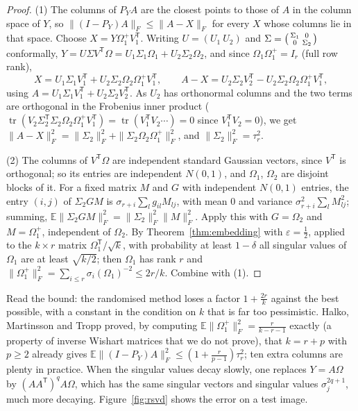 \begin{proof}
(1) The columns of $P_YA$ are the closest points to those of $A$ in the column space of $Y$, so $\|(I-P_Y)A\|_F\le\|A-X\|_F$ for every $X$ whose columns lie in that space. Choose
$X=Y\Omega_1^+V_1^{\mathsf T}$. Writing $U=(U_1\ U_2)$ and $\Sigma=\begin{psmallmatrix}\Sigma_1&0\\0&\Sigma_2\end{psmallmatrix}$ conformally,
$Y=U\Sigma V^{\mathsf T}\Omega=U_1\Sigma_1\Omega_1+U_2\Sigma_2\Omega_2$, and since $\Omega_1\Omega_1^+=I_r$ (full row rank),
\[
X=U_1\Sigma_1V_1^{\mathsf T}+U_2\Sigma_2\Omega_2\Omega_1^+V_1^{\mathsf T},\qquad A-X=U_2\Sigma_2V_2^{\mathsf T}-U_2\Sigma_2\Omega_2\Omega_1^+V_1^{\mathsf T},
\]
using $A=U_1\Sigma_1V_1^{\mathsf T}+U_2\Sigma_2V_2^{\mathsf T}$. As $U_2$ has orthonormal columns and the two terms are orthogonal in the Frobenius inner product
($\operatorname{tr}(V_2\Sigma_2^{\mathsf T}\Sigma_2\Omega_2\Omega_1^+V_1^{\mathsf T})=\operatorname{tr}(V_1^{\mathsf T}V_2\cdots)=0$ since $V_1^{\mathsf T}V_2=0$), we get
$\|A-X\|_F^2=\|\Sigma_2\|_F^2+\|\Sigma_2\Omega_2\Omega_1^+\|_F^2$, and $\|\Sigma_2\|_F^2=\tau_r^2$.

(2) The columns of $V^{\mathsf T}\Omega$ are independent standard Gaussian vectors, since $V^{\mathsf T}$ is orthogonal; so its entries are independent $N(0,1)$, and $\Omega_1$, $\Omega_2$
are disjoint blocks of it. For a fixed matrix $M$ and $G$ with independent $N(0,1)$ entries, the entry $(i,j)$ of $\Sigma_2GM$ is $\sigma_{r+i}\sum_lg_{il}M_{lj}$, with mean $0$ and variance
$\sigma_{r+i}^2\sum_lM_{lj}^2$; summing, $\mathbb E\|\Sigma_2GM\|_F^2=\|\Sigma_2\|_F^2\|M\|_F^2$. Apply this with $G=\Omega_2$ and $M=\Omega_1^+$, independent of $\Omega_2$. By
Theorem~\ref{thm:embedding} with $\varepsilon=\frac12$, applied to the $k\times r$ matrix $\Omega_1^{\mathsf T}/\sqrt k$, with probability at least $1-\delta$ all singular values of $\Omega_1$ are
at least $\sqrt{k/2}$; then $\Omega_1$ has rank $r$ and $\|\Omega_1^+\|_F^2=\sum_{i\le r}\sigma_i(\Omega_1)^{-2}\le2r/k$. Combine with (1).
\end{proof}

Read the bound: the randomised method loses a factor $1+\frac{2r}k$ against the best possible, with a constant in the condition on $k$ that is far too pessimistic. Halko, Martinsson and
Tropp proved, by computing $\mathbb E\|\Omega_1^+\|_F^2=\frac r{k-r-1}$ exactly (a property of inverse Wishart matrices that we do not prove), that $k=r+p$ with $p\ge2$ already gives
$\mathbb E\|(I-P_Y)A\|_F^2\le(1+\frac r{p-1})\tau_r^2$; ten extra columns are plenty in practice. When the singular values decay slowly, one replaces $Y=A\Omega$ by $(AA^{\mathsf T})^qA\Omega$,
which has the same singular vectors and singular values $\sigma_j^{2q+1}$, much more decaying. Figure~\ref{fig:rsvd} shows the error on a test image.

